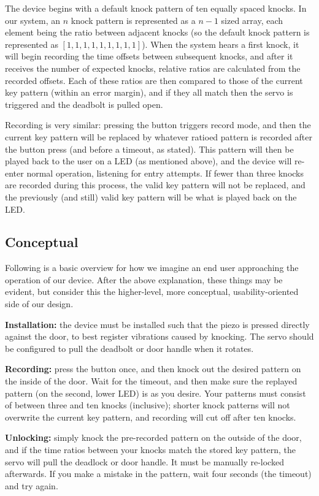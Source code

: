 \documentclass[11pt]{article}			%
\begin{document}
The device begins with a default knock pattern of ten equally spaced knocks. In our system, an $n$ knock pattern is represented as a $n-1$ sized array, each element being the ratio between adjacent knocks (so the default knock pattern is represented as $[1, 1, 1, 1, 1, 1, 1, 1, 1]$). When the system hears a first knock, it will begin recording the time offsets between subsequent knocks, and after it receives the number of expected knocks, relative ratios are calculated from the recorded offsets. Each of these ratios are then compared to those of the current key pattern (within an error margin), and if they all match then the servo is triggered and the deadbolt is pulled open.

Recording is very similar: pressing the button triggers record mode, and then the current key pattern will be replaced by whatever ratioed pattern is recorded after the button press (and before a timeout, as stated). This pattern will then be played back to the user on a LED (as mentioned above), and the device will re-enter normal operation, listening for entry attempts. If fewer than three knocks are recorded during this process, the valid key pattern will not be replaced, and the previously (and still) valid key pattern will be what is played back on the LED.

\subsection{Conceptual}

Following is a basic overview for how we imagine an end user approaching the operation of our device. After the above explanation, these things may be evident, but consider this the higher-level, more conceptual, usability-oriented side of our design. 

\textbf{Installation:} the device must be installed such that the piezo is pressed directly against the door, to best register vibrations caused by knocking. The servo should be configured to pull the deadbolt or door handle when it rotates.

\textbf{Recording:} press the button once, and then knock out the desired pattern on the inside of the door. Wait for the timeout, and then make sure the replayed pattern (on the second, lower LED) is as you desire. Your patterns must consist of between three and ten knocks (inclusive); shorter knock patterns will not overwrite the current key pattern, and recording will cut off after ten knocks.

\textbf{Unlocking:} simply knock the pre-recorded pattern on the outside of the door, and if the time ratios between your knocks match the stored key pattern, the servo will pull the deadlock or door handle. It must be manually re-locked afterwards. If you make a mistake in the pattern, wait four seconds (the timeout) and try again.
\end{document}
